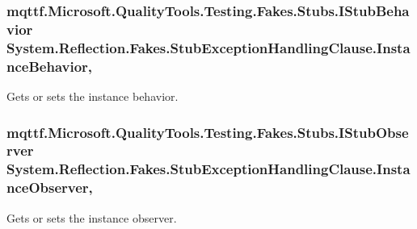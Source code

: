 \hypertarget{class_system_1_1_reflection_1_1_fakes_1_1_stub_exception_handling_clause_a9ff3fe5aa6c71ffd1d3607d0f47cfe8f}{
\subsubsection[{Instance\-Behavior}]{\setlength{\rightskip}{0pt plus 5cm}mqttf.\-Microsoft.\-Quality\-Tools.\-Testing.\-Fakes.\-Stubs.\-I\-Stub\-Behavior System.\-Reflection.\-Fakes.\-Stub\-Exception\-Handling\-Clause.\-Instance\-Behavior\hspace{0.3cm}{\ttfamily [get]}, {\ttfamily [set]}}}\label{class_system_1_1_reflection_1_1_fakes_1_1_stub_exception_handling_clause_a9ff3fe5aa6c71ffd1d3607d0f47cfe8f}


Gets or sets the instance behavior.

\hypertarget{class_system_1_1_reflection_1_1_fakes_1_1_stub_exception_handling_clause_a3ffa2e3e8ea0661cc0ba24716f8a2cab}{
\subsubsection[{Instance\-Observer}]{\setlength{\rightskip}{0pt plus 5cm}mqttf.\-Microsoft.\-Quality\-Tools.\-Testing.\-Fakes.\-Stubs.\-I\-Stub\-Observer System.\-Reflection.\-Fakes.\-Stub\-Exception\-Handling\-Clause.\-Instance\-Observer\hspace{0.3cm}{\ttfamily [get]}, {\ttfamily [set]}}}\label{class_system_1_1_reflection_1_1_fakes_1_1_stub_exception_handling_clause_a3ffa2e3e8ea0661cc0ba24716f8a2cab}


Gets or sets the instance observer.

